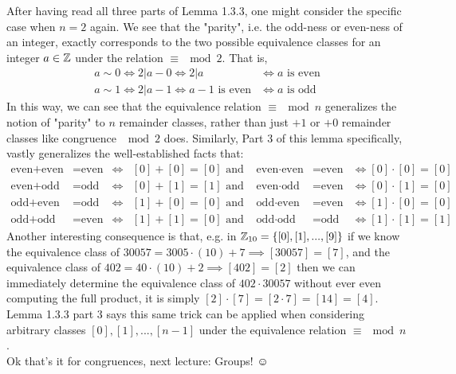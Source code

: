 \noindent After having read all three parts of Lemma 1.3.3, one might consider the specific case when $n=2$ again. We see that the "parity", i.e. the odd-ness or even-ness of an integer, exactly corresponds to the two possible equivalence classes for an integer $a\in {\mathbb{ Z}}$ under the relation $\equiv\mod 2$. That is,
\begin{align}
    a\sim0 \iff 2|a-0 \iff 2|a &\iff a \text{ is even} \nonumber \\
    a\sim1 \iff 2|a-1 \iff a-1 \text{ is even} &\iff a \text{ is odd} \nonumber
\end{align}
In this way, we can see that the equivalence relation $\equiv\mod n$ generalizes the notion of "parity" to $n$ remainder classes, rather than just $+1$ or $+0$ remainder classes like congruence $\mod 2$ does. Similarly, Part 3 of this lemma specifically, vastly generalizes the well-established facts that: 
\begin{align}
    \text{even}+\text{even}&=\text{even} &\iff &[0]+[0]=[0] \text{ \ \ and }& \text{even}\cdot \text{even} &=\text{even} &\iff [0]\cdot [0]=[0]\nonumber \\
    \text{even}+\text{odd}&=\text{odd} &\iff &[0]+[1]=[1] \text{ \ \ and }& \text{even}\cdot \text{odd} &=\text{even} &\iff [0]\cdot [1]=[0] \nonumber \\
    \text{odd}+\text{even}&=\text{odd} &\iff &[1]+[0]=[0] \text{ \ \ and }& \text{odd}\cdot \text{even} &=\text{even} &\iff [1]\cdot [0]=[0] \nonumber \\
    \text{odd}+\text{odd}&=\text{even} &\iff &[1]+[1]=[0] \text{ \ \ and }& \text{odd}\cdot \text{odd} &=\text{odd} &\iff [1]\cdot [1]=[1] \nonumber 
\end{align}
Another interesting consequence is that, e.g. in ${\mathbb{ Z}}_{10}=\{[0],[1],...,[9]\}$ if we know the equivalence class of $30057=3005\cdot(10)+7 \implies [30057]=[7]$, and the equivalence class of $402=40\cdot(10)+2 \implies [402]=[2]$ then we can immediately determine the equivalence class of $402\cdot 30057$ without ever even computing the full product, it is simply $[2]\cdot[7]=[2\cdot 7]=[14]=[4]$. Lemma 1.3.3 part 3 says this same trick can be applied when considering arbitrary classes $[0], [1], ... , [n-1]$ under the equivalence relation $\equiv \mod n$. \steezybreak\\
\noindent Ok that's it for congruences, next lecture: Groups! $\smiley{}$

